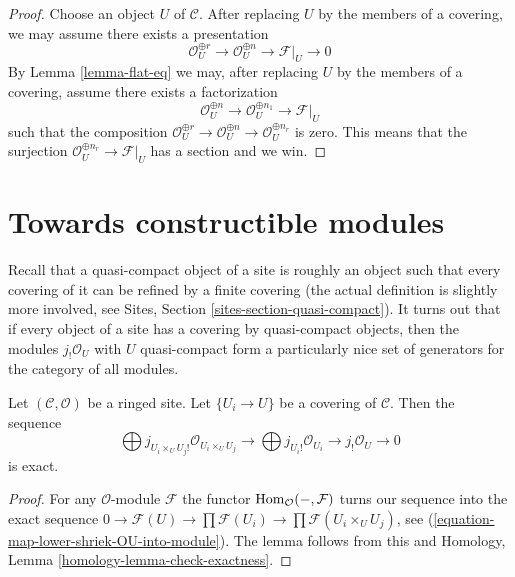 \begin{proof}
Choose an object $U$ of $\mathcal{C}$.
After replacing $U$ by the members of a covering, we may
assume there exists a presentation
$$
\mathcal{O}_U^{\oplus r} \to
\mathcal{O}_U^{\oplus n} \to \mathcal{F}|_U \to 0
$$
By Lemma \ref{lemma-flat-eq} we may, after replacing $U$
by the members of a covering, assume there exists a factorization
$$
\mathcal{O}_U^{\oplus n} \to
\mathcal{O}_U^{\oplus n_1} \to \mathcal{F}|_U
$$
such that the composition
$\mathcal{O}_U^{\oplus r} \to \mathcal{O}_U^{\oplus n}
\to \mathcal{O}_U^{\oplus n_r}$ is zero.
This means that the surjection $\mathcal{O}_U^{\oplus n_r} \to \mathcal{F}|_U$
has a section and we win.
\end{proof}











\section{Towards constructible modules}
\label{section-constructible}

\noindent
Recall that a quasi-compact object of a site is roughly an object
such that every covering of it can be refined by a finite covering
(the actual definition is slightly more involved, see
Sites, Section \ref{sites-section-quasi-compact}). It turns out that
if every object of a site has a covering by quasi-compact objects, then
the modules $j_!\mathcal{O}_U$ with $U$ quasi-compact form a particularly
nice set of generators for the category of all modules.

\begin{lemma}
\label{lemma-covering-gives-surjection}
Let $(\mathcal{C}, \mathcal{O})$ be a ringed site. Let $\{U_i \to U\}$
be a covering of $\mathcal{C}$. Then the sequence
$$
\bigoplus j_{U_i \times_U U_j!}\mathcal{O}_{U_i \times_U U_j} \to
\bigoplus j_{U_i!}\mathcal{O}_{U_i} \to j_!\mathcal{O}_U \to 0
$$
is exact.
\end{lemma}

\begin{proof}
For any $\mathcal{O}$-module $\mathcal{F}$ the functor
$\mathop{\mathrm{Hom}}\nolimits_\mathcal{O}(-, \mathcal{F})$ turns our sequence into the exact sequence
$0 \to \mathcal{F}(U) \to \prod \mathcal{F}(U_i) \to
\prod \mathcal{F}(U_i \times_U U_j)$, see
(\ref{equation-map-lower-shriek-OU-into-module}). The lemma follows from
this and
Homology, Lemma \ref{homology-lemma-check-exactness}.
\end{proof}

